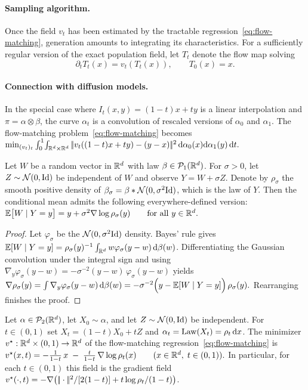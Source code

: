 \paragraph{Sampling algorithm.}
Once the field $v_t$ has been estimated by the tractable regression~\eqref{eq:flow-matching}, generation amounts to integrating its characteristics. For a sufficiently regular version of the exact population field, let $T_t$ denote the flow map solving
\begin{equation}\label{eq-flow-matching-sampling-map}
\partial_tT_t(x)=v_t(T_t(x)),
\qquad T_0(x)=x.
\end{equation}
\paragraph{Connection with diffusion models.}\label{par-diffusion-model-connection}
In the special case where $I_t(x,y)=(1-t)x+ty$ is a linear interpolation and $\pi = \alpha \otimes \beta$, the curve $\alpha_t$ is a convolution of rescaled versions of $\alpha_0$ and $\alpha_1$. The flow-matching problem~\eqref{eq:flow-matching} becomes
\(\min_{(v_t)_t} \int_0^1\!\int_{\mathbb{R}^{d} \times \mathbb{R}^d} |\!| v_t( (1-t)x+t y ) - (y-x)  |\!|^2 \, \mathrm{d}\alpha_0(x) \mathrm{d}\alpha_1(y)\,\mathrm{d} t.\)
\begin{proposition}\label{prop:Tweedie}
Let $W$ be a random vector in $\mathbb{R}^{d}$ with law $\beta\in\mathcal{P}_1(\mathbb{R}^d)$.
For $\sigma>0$, let $Z\sim\mathcal{N}(0,\mathrm{Id})$ be independent of $W$ and observe
\(Y=W+\sigma Z.\)
Denote by $\rho_\sigma$ the smooth positive density of \(\beta_\sigma=\beta * \mathcal{N}(0,\sigma^{2}\mathrm{Id})\), which is the law of $Y$.
Then the conditional mean admits the following everywhere-defined version: \(\mathbb{E}\bigl[W\mid Y=y\bigr] =y+\sigma^{2}\nabla \log \rho_\sigma(y) \qquad\text{for all } y \in \mathbb{R}^{d}.\)
\end{proposition}
\begin{proof}
Let $\varphi_\sigma$ be the $\mathcal{N}(0,\sigma^{2}\mathrm{Id})$ density. Bayes' rule gives \(\mathbb{E}[W\mid Y=y]=\rho_\sigma(y)^{-1}\int_{\mathbb{R}^{d}} w\varphi_\sigma(y-w)\,\mathrm{d}\beta(w)\).
Differentiating the Gaussian convolution under the integral sign and using
$
\nabla_y\varphi_\sigma(y-w)
= -\sigma^{-2}(y-w)\,\varphi_\sigma(y-w)
$
yields
\(\nabla\rho_\sigma(y) = \int \nabla_y\varphi_\sigma(y-w)\,\mathrm{d}\beta(w) = -\sigma^{-2}\Bigl(y-\mathbb{E}[W\mid Y=y]\Bigr)\,\rho_\sigma(y).\)
Rearranging finishes the proof.
\end{proof}
\begin{proposition}\label{prop:flow}
Let \(\alpha\in\mathcal{P}_2(\mathbb{R}^d)\), let $X_0\sim\alpha$, and let $Z\sim\mathcal{N}(0,\mathrm{Id})$ be independent.
For $t\in(0,1)$ set \(X_t=(1-t)X_0+tZ\) and \(\alpha_t=\operatorname{Law}(X_t)=\rho_t\,\mathrm{d} x\). The minimizer $v^\star:\mathbb{R}^d\times(0,1)\to\mathbb{R}^d$ of the flow-matching regression~\eqref{eq:flow-matching} is
\(v^\star(x,t) = -\frac{1}{1-t}\,x \;-\; \frac{t}{1-t}\,\nabla\log\rho_t(x) \qquad (x\in\mathbb{R}^{d},\;t\in(0,1)).\)
In particular, for each $t\in(0,1)$ this field is the gradient field \(v^\star(\cdot,t)=-\nabla\bigl(|\!| \cdot |\!|^2/[2(1-t)]+t\log\rho_t/(1-t)\bigr)\).
\end{proposition}
